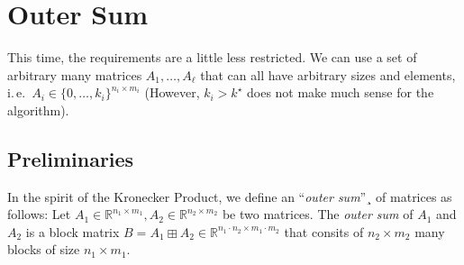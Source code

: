 \documentclass[a4paper,11pt]{article}
\theoremstyle{mystyle}
\newcommand{\ie}{i.\,e.\ }
\begin{document}
\section{Outer Sum}
This time, the requirements are a little less restricted. We can use a set of arbitrary many matrices $A_1, \dots, A_\ell$ that can all have arbitrary sizes and elements, \ie $A_i \in \{0, \dots, k_i\}^{n_i \times m_i}$ (However, $k_i>k^\star$ does not make much sense for the algorithm).

\subsection{Preliminaries}
In the spirit of the Kronecker Product, we define an ``\emph{outer sum}''¸ of matrices as follows: Let $A_1 \in \mathbb{R}^{n_1 \times m_1}, A_2 \in \mathbb{R}^{n_2 \times m_2}$ be two matrices. The \emph{outer sum} of $A_1$ and $A_2$ is a block matrix $B = A_1 \boxplus A_2 \in \mathbb{R}^{n_1 \cdot n_2 \times m_1 \cdot m_2}$ that consits of $n_2 \times m_2$ many blocks of size $n_1 \times m_1$.
\end{document}
